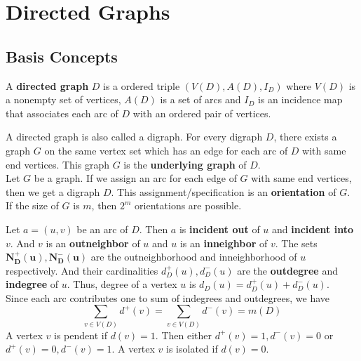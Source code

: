 \section{Directed Graphs}
\setcounter{subsection}{1}
\subsection{Basis Concepts}
\begin{definition}
	A \textbf{directed graph} $D$ is a ordered triple $(V(D),A(D),I_D)$ where $V(D)$ is a nonempty set of vertices, $A(D)$ is a set of arcs and $I_D$ is an incidence map that associates each arc of $D$ with an ordered pair of vertices.
\end{definition}

\begin{remark}
	A directed graph is also called a digraph. For every digraph $D$, there exists a graph $G$ on the same vertex set which has an edge for each arc of $D$ with same end vertices. This graph $G$ is the \textbf{underlying graph} of $D$.\\

	Let $G$ be a graph. If we assign an arc for each edge of $G$ with same end vertices, then we get a digraph $D$. This assignment/specification is an \textbf{orientation} of $G$. If the size of $G$ is $m$, then $2^m$ orientations are possible.
\end{remark}

\begin{definition}
	Let $a = (u,v)$ be an arc of $D$. Then $a$ is \textbf{incident out} of $u$ and \textbf{incident into} $v$. And $v$ is an \textbf{outneighbor} of $u$ and $u$ is an \textbf{inneighbor} of $v$. The sets $\mathbf{N^+_D(u), N^-_D(u)}$ are the outneighborhood and inneighborhood of $u$ respectively. And their cardinalities $d^+_D(u),d^-_D(u)$ are the \textbf{outdegree} and \textbf{indegree} of $u$. Thus, degree of a vertex $u$ is $d_D(u) = d^+_D(u) + d^-_D(u)$.\\

	Since each arc contributes one to sum of indegrees and outdegrees, we have
	$$ \sum_{v \in V(D)} d^+(v) = \sum_{v \in V(D)} d^-(v) = m(D) $$
	A vertex $v$ is pendent if $d(v) = 1$. Then either $d^+(v) = 1, d^-(v) = 0$ or $d^+(v) = 0, d^-(v) = 1$. A vertex $v$ is isolated if $d(v) = 0$.
\end{definition}

